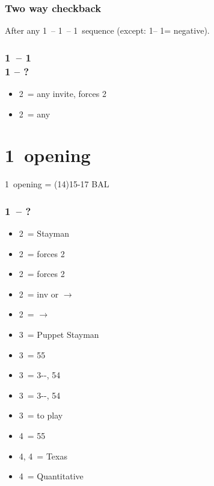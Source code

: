 \subsubsection*{Two way checkback}

After any 1\ -- 1\ -- 1\ sequence (except:
1\clubs -- 1\diams = negative).

\subsubsection*{1\ -- 1 \\ 1 -- ?}
\begin{itemize}
    \item 2\clubs\ = any invite, forces 2\diams
    \item 2\diams\ = any \gf
\end{itemize}

\section{\texorpdfstring{1\ntx\ opening}{1ntOpening}}\label{sec:1ntOpening}

1\nt\ opening = (14)15-17 BAL

\subsubsection*{1\ntx\ -- ?}
\begin{itemize}
    \item 2\clubs\ = Stayman
    \item 2\diams\ = forces 2\hearts
    \item 2\hearts\ = forces 2\spades
    \item 2\spades\ = inv or $\rightarrow$ \clubs
    \item 2\nt\ = $\rightarrow$ \diams
    \item 3\clubs\ = Puppet Stayman
    \item 3\diams\ = 55\minor
    \item 3\hearts\ = 3--\hearts, 54\minor
    \item 3\spades\ = 3--\spades, 54\minor
    \item 3\nt\ = to play
    \item 4\clubs\ = 55\major
    \item 4\diams, 4\hearts\ = Texas
    \item 4\nt\ = Quantitative
\end{itemize}

